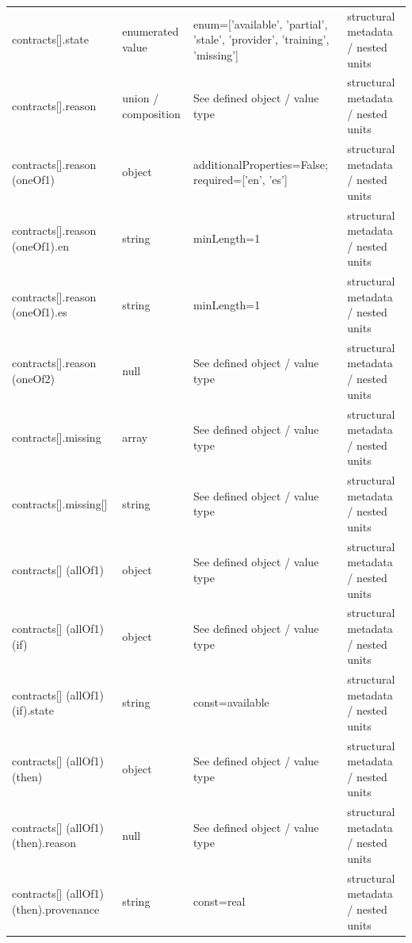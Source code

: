 \begin{longtable}{@{}>{\raggedright\arraybackslash}p{}>{\raggedright\arraybackslash}p{}>{\raggedright\arraybackslash}p{}>{\raggedright\arraybackslash}p{}@{}}
contracts[].\allowbreak{}state & enumerated value & enum=\allowbreak{}['available', 'partial', 'stale', 'provider', 'training', 'missing'] & structural metadata /\allowbreak{} nested units\\
contracts[].\allowbreak{}reason & union /\allowbreak{} composition & See defined object /\allowbreak{} value type & structural metadata /\allowbreak{} nested units\\
contracts[].\allowbreak{}reason (oneOf1) & object & additionalProperties=\allowbreak{}False; required=\allowbreak{}['en', 'es'] & structural metadata /\allowbreak{} nested units\\
contracts[].\allowbreak{}reason (oneOf1).\allowbreak{}en & string & minLength=\allowbreak{}1 & structural metadata /\allowbreak{} nested units\\
contracts[].\allowbreak{}reason (oneOf1).\allowbreak{}es & string & minLength=\allowbreak{}1 & structural metadata /\allowbreak{} nested units\\
contracts[].\allowbreak{}reason (oneOf2) & null & See defined object /\allowbreak{} value type & structural metadata /\allowbreak{} nested units\\
contracts[].\allowbreak{}missing & array & See defined object /\allowbreak{} value type & structural metadata /\allowbreak{} nested units\\
contracts[].\allowbreak{}missing[] & string & See defined object /\allowbreak{} value type & structural metadata /\allowbreak{} nested units\\
contracts[] (allOf1) & object & See defined object /\allowbreak{} value type & structural metadata /\allowbreak{} nested units\\
contracts[] (allOf1) (if) & object & See defined object /\allowbreak{} value type & structural metadata /\allowbreak{} nested units\\
contracts[] (allOf1) (if).\allowbreak{}state & string & const=\allowbreak{}available & structural metadata /\allowbreak{} nested units\\
contracts[] (allOf1) (then) & object & See defined object /\allowbreak{} value type & structural metadata /\allowbreak{} nested units\\
contracts[] (allOf1) (then).\allowbreak{}reason & null & See defined object /\allowbreak{} value type & structural metadata /\allowbreak{} nested units\\
contracts[] (allOf1) (then).\allowbreak{}provenance & string & const=\allowbreak{}real & structural metadata /\allowbreak{} nested units\\

\end{longtable}

